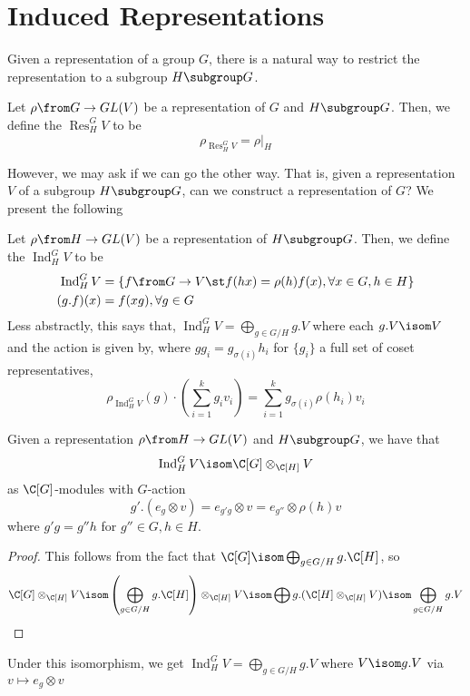 \documentclass[11pt,leqno,oneside]{amsbook}
\newcommand{\Res}{\operatorname{Res}}
\newcommand{\Ind}{\operatorname{Ind}}
\numberwithin{thm}{section}
\begin{document}
\section{Induced Representations}
Given a representation of a group \(G\), there is a natural way to
restrict the representation to a subgroup \(H \subgroup G\).
\begin{defn}
  Let \(\rho \from G \to GL(V)\) be a representation of \(G\) and \(H \subgroup G\). Then,
  we define the  \(\Res_H^G V\) to be \[
    \rho_{\Res_H^G V} = \rho|_H
  \]
\end{defn}
However, we may ask if we can go the other way. That is, given a
representation \(V\) of a subgroup \(H \subgroup G\), can we construct
a representation of \(G\)? We present the following
\begin{defn}
  Let \(\rho \from H \to GL(V)\) be a representation of \(H \subgroup
  G\). Then, we define the  \(\Ind_H^G V\)
  to be
  \begin{align*}
    \Ind_H^G V & = \{f \from G \to V \st f(hx) = \rho(h)f(x), \forall x
    \in G, h \in H\} \\
    (g.f)(x) & = f(xg), \forall g \in G
  \end{align*}
  Less abstractly, this says that, \(\Ind_H^G V = \bigoplus_{g \in G/H}
  g.V\) where each \(g.V \isom V\) and the action is given by,
  where \(gg_i = g_{\sigma(i)}h_i\) for \(\{g_i\}\) a full set of
  coset representatives, \[
    \rho_{\Ind_H^G V}(g) \cdot \left( \sum_{i = 1}^k g_i v_i \right)
    = \sum_{i=1}^k g_{\sigma(i)} \rho(h_i) v_i
  \]
\end{defn}
\begin{prop}
  Given a representation \(\rho \from H \to GL(V)\) and \(H \subgroup
  G\), we have that \[
    \Ind_H^G V \isom \C[G] \otimes_{\C[H]} V
  \]
  as \(\C[G]\)-modules with \(G\)-action \[
    g'.(e_g \otimes v) = e_{g'g} \otimes v = e_{g''} \otimes \rho(h) v
  \]
  where \(g'g = g''h\) for \(g'' \in G, h \in H\).
\end{prop}
\begin{proof}
  This follows from the fact that \(\C[G] \isom \bigoplus_{g \in G/H}
  g.\C[H]\), so \[
    \C[G] \otimes_{\C[H]} V \isom \left( \bigoplus_{g \in G/H} g.\C[H]
    \right) \otimes_{\C[H]} V \isom \bigoplus g.(\C[H] \otimes_{\C[H]}
    V) \isom \bigoplus_{g \in G/H} g.V
  \]
\end{proof}
\begin{rmk}
  Under this isomorphism, we get \(\Ind_H^G V = \bigoplus_{g \in G/H}
  g.V\) where \(V \isom g.V\) via \(v \mapsto e_g \otimes v\)
\end{rmk}
\end{document}
